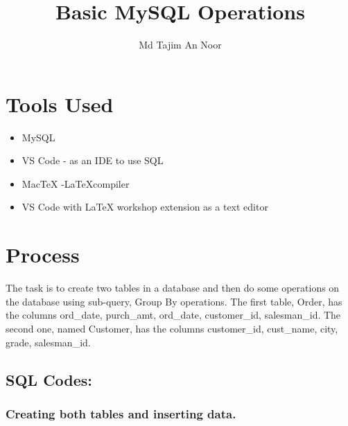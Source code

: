 \documentclass[12pt]{article}
\title{Basic MySQL Operations}
\author{Md Tajim An Noor}
\date{}
\begin{document}

\pagebreak

\tableofcontents

\maketitle

\section{Tools Used}
\begin{itemize}
    \item MySQL
    \item VS Code - as an IDE to use SQL
    \item MacTeX -\LaTeX  compiler
    \item VS Code with LaTeX workshop extension as a text editor
\end{itemize}


\section{Process}
The task is to create two tables in a database and then do some operations on the database using sub-query, Group By operations. The first table, Order, has the columns  ord\_date, purch\_amt, ord\_date, customer\_id, salesman\_id. The second one, named Customer, has the columns customer\_id, cust\_name, city, grade, salesman\_id.

\subsection{SQL Codes:}

\subsubsection*{Creating both tables and inserting data.}
\end{document}
